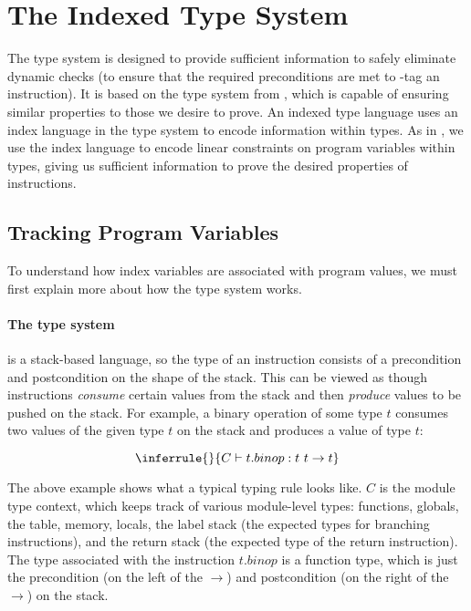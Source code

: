 \section{The \name Indexed Type System}
\label{sec:typesys}
The \name type system is designed to provide sufficient information to safely eliminate dynamic checks (\ie to ensure that the required preconditions are met to \prechk-tag an instruction).
It is based on the type system from \dtal, which is capable of ensuring similar properties to those we desire to prove.
An indexed type language uses an index language in the type system to encode information within types.
As in \dtal, we use the index language to encode linear constraints on program variables within types, giving us sufficient information to prove the desired properties of instructions.

\subsection{Tracking Program Variables}
To understand how \name index variables are associated with \name program values, we must first explain more about how the \wasm type system works.

\paragraph{The \wasm type system}
\wasm is a stack-based language, so the type of an instruction consists of a precondition and postcondition on the shape of the stack.
This can be viewed as though instructions \emph{consume} certain values from the stack and then \emph{produce} values to be pushed on the stack.
For example, a binary operation of some type $t$ consumes two values of the given type $t$ on the stack and produces a value of type $t$:

\[
    \inferrule{ }{C \vdash t.binop : t\ t \rightarrow t}
\]

The above example shows what a typical \wasm typing rule looks like.
$C$ is the module type context, which keeps track of various module-level types: functions, globals, the table, memory, locals, the label stack (\ie the expected types for branching instructions), and the return stack (\ie the expected type of the return instruction).
The type associated with the instruction $t.binop$ is a \wasm function type, which is just the precondition (on the left of the $\rightarrow$) and postcondition (on the right of the $\rightarrow$) on the stack.

